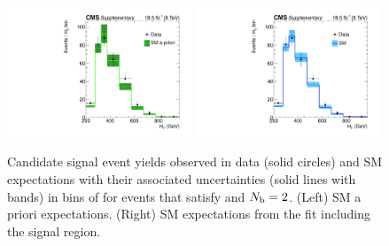 \begin{figure}[h!]
  \begin{center}
    \includegraphics[width=0.49\textwidth,page=2]{figures/fit_result/bestFit_2012dev_RQcdZero_fZinvAll_2b_ge4j-1_smOnly} 
    \includegraphics[width=0.49\textwidth,page=2]{figures/fit_result/bestFit_2012dev_RQcdZero_fZinvAll_2b_ge4j-1h_smOnly} \\
    \caption{\label{fig:best-fit-0b} Candidate signal event yields
      observed in data (solid circles) and SM expectations with their
      associated uncertainties (solid lines with bands) in bins of
      \scalht for events that satisfy \njethigh and $N_{\text{b}} = 2$. (Left)
      SM a priori expectations. (Right) SM expectations from the fit
      including the signal region. }
  \end{center}
\end{figure}


